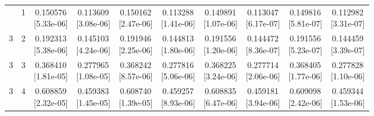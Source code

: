 \documentclass[12pt,letterpaper]{article}
\theoremstyle{plain}
\theoremstyle{definition}
\begin{document}
\begin{table}[p]
\begin{adjustbox}{max width=\linewidth}
\begin{tabular}{@{}rr*{8}{c}@{}}
\addlinespace[2pt]
3 & 1 & \shortstack{0.150576\\[-1pt]{\scriptsize[5.33e-06]}} & \shortstack{0.113609\\[-1pt]{\scriptsize[3.08e-06]}} & \shortstack{0.150162\\[-1pt]{\scriptsize[2.47e-06]}} & \shortstack{0.113288\\[-1pt]{\scriptsize[1.41e-06]}} & \shortstack{0.149891\\[-1pt]{\scriptsize[1.07e-06]}} & \shortstack{0.113047\\[-1pt]{\scriptsize[6.17e-07]}} & \shortstack{0.149816\\[-1pt]{\scriptsize[5.81e-07]}} & \shortstack{0.112982\\[-1pt]{\scriptsize[3.31e-07]}}\\
3 & 2 & \shortstack{0.192313\\[-1pt]{\scriptsize[5.38e-06]}} & \shortstack{0.145103\\[-1pt]{\scriptsize[4.24e-06]}} & \shortstack{0.191946\\[-1pt]{\scriptsize[2.25e-06]}} & \shortstack{0.144813\\[-1pt]{\scriptsize[1.80e-06]}} & \shortstack{0.191556\\[-1pt]{\scriptsize[1.20e-06]}} & \shortstack{0.144472\\[-1pt]{\scriptsize[8.36e-07]}} & \shortstack{0.191556\\[-1pt]{\scriptsize[5.23e-07]}} & \shortstack{0.144459\\[-1pt]{\scriptsize[3.39e-07]}}\\
3 & 3 & \shortstack{0.368410\\[-1pt]{\scriptsize[1.81e-05]}} & \shortstack{0.277965\\[-1pt]{\scriptsize[1.08e-05]}} & \shortstack{0.368242\\[-1pt]{\scriptsize[8.57e-06]}} & \shortstack{0.277816\\[-1pt]{\scriptsize[5.06e-06]}} & \shortstack{0.368225\\[-1pt]{\scriptsize[3.24e-06]}} & \shortstack{0.277714\\[-1pt]{\scriptsize[2.06e-06]}} & \shortstack{0.368405\\[-1pt]{\scriptsize[1.77e-06]}} & \shortstack{0.277828\\[-1pt]{\scriptsize[1.10e-06]}}\\
3 & 4 & \shortstack{0.608859\\[-1pt]{\scriptsize[2.32e-05]}} & \shortstack{0.459383\\[-1pt]{\scriptsize[1.45e-05]}} & \shortstack{0.608740\\[-1pt]{\scriptsize[1.39e-05]}} & \shortstack{0.459257\\[-1pt]{\scriptsize[8.93e-06]}} & \shortstack{0.608835\\[-1pt]{\scriptsize[6.47e-06]}} & \shortstack{0.459181\\[-1pt]{\scriptsize[3.94e-06]}} & \shortstack{0.609098\\[-1pt]{\scriptsize[2.42e-06]}} & \shortstack{0.459344\\[-1pt]{\scriptsize[1.53e-06]}}\\

\end{tabular}
\end{adjustbox}
\end{table}
\end{document}
